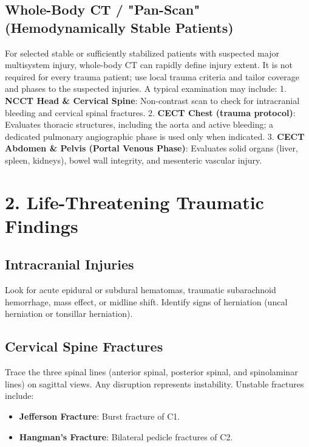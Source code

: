 \subsection*{Whole-Body CT / "Pan-Scan" (Hemodynamically Stable Patients)}
For selected stable or sufficiently stabilized patients with suspected major multisystem injury, whole-body CT can rapidly define injury extent. It is not required for every trauma patient; use local trauma criteria and tailor coverage and phases to the suspected injuries. A typical examination may include:
1. \textbf{NCCT Head \& Cervical Spine}: Non-contrast scan to check for intracranial bleeding and cervical spinal fractures.
2. \textbf{CECT Chest (trauma protocol)}: Evaluates thoracic structures, including the aorta and active bleeding; a dedicated pulmonary angiographic phase is used only when indicated.
3. \textbf{CECT Abdomen \& Pelvis (Portal Venous Phase)}: Evaluates solid organs (liver, spleen, kidneys), bowel wall integrity, and mesenteric vascular injury.


\section*{2. Life-Threatening Traumatic Findings}

\subsection*{Intracranial Injuries}
Look for acute epidural or subdural hematomas, traumatic subarachnoid hemorrhage, mass effect, or midline shift. Identify signs of herniation (uncal herniation or tonsillar herniation).

\subsection*{Cervical Spine Fractures}
Trace the three spinal lines (anterior spinal, posterior spinal, and spinolaminar lines) on sagittal views. Any disruption represents instability. Unstable fractures include:
\begin{itemize}
    \item \textbf{Jefferson Fracture}: Burst fracture of C1.
    \item \textbf{Hangman's Fracture}: Bilateral pedicle fractures of C2.
\end{itemize}

